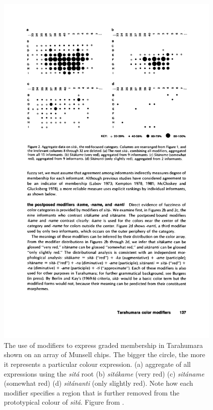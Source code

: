 \begin{figure}[htbp]
  \begin{center}
   \includegraphics[width=\textwidth]{./intro/figures/tarahumara.pdf}
   \caption[The use of modifiers in Tarahumara]{The use of modifiers
     to express graded membership in Tarahumara shown on an array of
     Munsell chips. The bigger the circle, the more it represents a
     particular colour expression. (a) aggregate of all expressions
     using the \textit{sit\'a} root (b) \textit{sit\'akame} (very red) (c)
     \textit{sit\'aname} (somewhat red) (d) \textit{sit\'ananti} (only slightly
     red). Note how each modifier specifies a region that is further
     removed from the prototypical colour of \textit{sit\'a}. Figure from
     \cite{burgress83tarahumara}.}
    \label{f:tarahumara}
  \end{center}
\end{figure}

